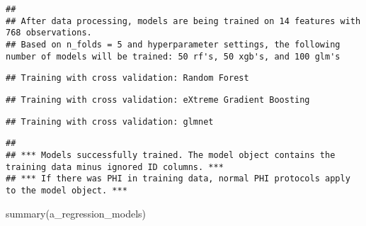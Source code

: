 \documentclass[
]{article}
\newenvironment{Shaded}{\begin{snugshade}}{\end{snugshade}}
\newcommand{\FunctionTok}[1]{\textcolor[rgb]{0.00,0.00,0.00}{#1}}
\newcommand{\NormalTok}[1]{#1}
\begin{document}
\begin{verbatim}
## 
## After data processing, models are being trained on 14 features with 768 observations.
## Based on n_folds = 5 and hyperparameter settings, the following number of models will be trained: 50 rf's, 50 xgb's, and 100 glm's
\end{verbatim}

\begin{verbatim}
## Training with cross validation: Random Forest
\end{verbatim}

\begin{verbatim}
## Training with cross validation: eXtreme Gradient Boosting
\end{verbatim}

\begin{verbatim}
## Training with cross validation: glmnet
\end{verbatim}

\begin{verbatim}
## 
## *** Models successfully trained. The model object contains the training data minus ignored ID columns. ***
## *** If there was PHI in training data, normal PHI protocols apply to the model object. ***
\end{verbatim}

\begin{Shaded}
\begin{Highlighting}[]
\FunctionTok{summary}\NormalTok{(a\_regression\_models)}
\end{Highlighting}
\end{Shaded}
\end{document}
